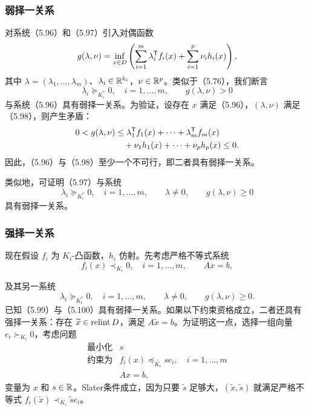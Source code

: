 \subsubsection*{弱择一关系}
对系统（5.96）和（5.97）引入对偶函数
\[
g(\lambda,\nu)=\inf_{x\in D}\left(\sum_{i=1}^m\lambda_i^\mathsf T f_i(x)+\sum_{i=1}^p\nu_i h_i(x)\right),
\]
其中 $\lambda=(\lambda_1,\ldots,\lambda_m)$、$\lambda_i\in\mathbb R^{k_i}$，$\nu\in\mathbb R^p$。类似于（5.76），我们断言
\begin{equation}
\lambda_i\succeq_{K_i^*}0,\quad i=1,\ldots,m,\qquad
g(\lambda,\nu)>0\tag{5.98}
\end{equation}
与系统（5.96）具有弱择一关系。为验证，设存在 $x$ 满足（5.96），$(\lambda,\nu)$ 满足（5.98），则产生矛盾：
\[
\begin{split}
0<g(\lambda,\nu)
&\le\lambda_1^\mathsf T f_1(x)+\cdots+\lambda_m^\mathsf T f_m(x)\\
&\quad+\nu_1h_1(x)+\cdots+\nu_ph_p(x)\le0.
\end{split}
\]
因此，（5.96）与（5.98）至少一个不可行，即二者具有弱择一关系。

类似地，可证明（5.97）与系统
\[
\lambda_i\succeq_{K_i^*}0,\quad i=1,\ldots,m,\qquad
\lambda\ne0,\qquad g(\lambda,\nu)\ge0
\]
具有弱择一关系。

\subsubsection*{强择一关系}
现在假设 $f_i$ 为 $K_i$-凸函数，$h_i$ 仿射。先考虑严格不等式系统
\begin{equation}
f_i(x)\prec_{K_i}0,\quad i=1,\ldots,m,\qquad Ax=b,\tag{5.99}
\end{equation}

及其另一系统
\begin{equation}
\lambda_i\succeq_{K_i^*}0,\quad i=1,\ldots,m,\qquad
\lambda\ne0,\qquad g(\lambda,\nu)\ge0.\tag{5.100}
\end{equation}
已知（5.99）与（5.100）具有弱择一关系。如果以下约束资格成立，二者还具有强择一关系：存在 $\widetilde x\in\operatorname{relint} D$，满足 $A\widetilde x=b$。为证明这一点，选择一组向量 $e_i\succ_{K_i}0$，考虑问题
\begin{equation}
\begin{array}{ll}\text{最小化}&s\\
\text{约束为}&f_i(x)\preceq_{K_i}s e_i,\quad i=1,\ldots,m\\
&Ax=b,\end{array}\tag{5.101}
\end{equation}
变量为 $x$ 和 $s\in\mathbb R$。Slater条件成立，因为只要 $\widetilde s$ 足够大，$(\widetilde x,\widetilde s)$ 就满足严格不等式 $f_i(\widetilde x)\prec_{K_i}\widetilde s e_i$。

